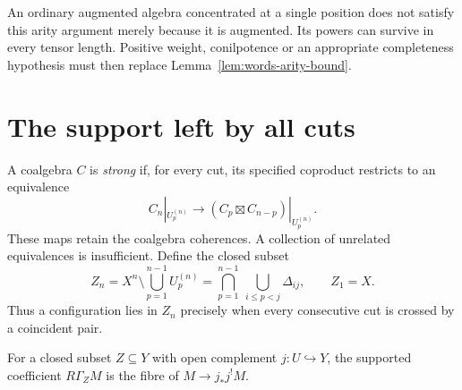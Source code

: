 An ordinary augmented algebra concentrated at a single position
does not satisfy this arity argument merely because it is augmented.
Its powers can survive in every tensor length.  Positive weight,
conilpotence or an appropriate completeness hypothesis must then
replace Lemma~\ref{lem:words-arity-bound}.

\section{The support left by all cuts}

A coalgebra \(C\) is \emph{strong} if, for every cut, its specified
coproduct restricts to an equivalence
\begin{equation}
 C_n|_{U_p^{(n)}}\longrightarrow
 (C_p\boxtimes C_{n-p})|_{U_p^{(n)}}.
 \label{eq:words-strong}
\end{equation}
These maps retain the coalgebra coherences.  A collection of
unrelated equivalences is insufficient.  Define the closed subset
\begin{equation}
 Z_n=X^n\setminus\bigcup_{p=1}^{n-1}U_p^{(n)}
     =\bigcap_{p=1}^{n-1}\ \bigcup_{i\leq p<j}\Delta_{ij},
 \qquad Z_1=X.
 \label{eq:words-support}
\end{equation}
Thus a configuration lies in \(Z_n\) precisely when every
consecutive cut is crossed by a coincident pair.

For a closed subset \(Z\subseteq Y\) with open complement
\(j:U\hookrightarrow Y\), the supported coefficient
\(R\Gamma_Z M\) is the fibre of \(M\to j_*j^!M\).

